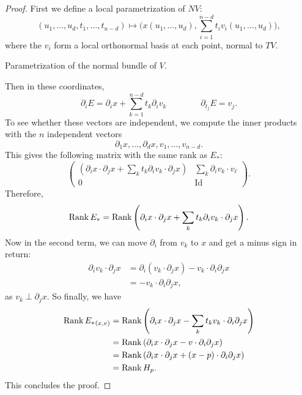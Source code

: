 \begin{proof}
    First we define a local parametrization of $NV$:
    \[
        (u_1, \ldots, u_d, t_1, \ldots, t_{n-d}) \mapsto \Big(x(u_1, \ldots, u_d), \sum_{i=1}^{n-d} t_i v_i(u_1, \ldots, u_{d})\Big)
    ,\] 
    where the $v_i$ form a local orthonormal basis at each point, normal to $TV$.
\begin{marginfigure}
    \centering
    \caption{Parametrization of the normal bundle of $V$.}
    \label{fig:abundance-of-morse-functions-parametrization-of-the-normal-bundle}
\end{marginfigure}
    Then in these coordinates,
    \[
        \partial_i E = \partial_i x  + \sum_{k=1}^{n-d} t_k \partial_i v_k 
        \qquad
        \qquad
        \partial_{t_j} E  = v_j
    .\]
    To see whether these vectors are independent, we compute the inner products with the $n$ independent vectors
    \[
    \partial_1 x , \ldots, \partial_d x , v_1, \ldots, v_{n-d}
    .\] 
    This gives the following matrix with the same rank as $E_*$:
     \[
    \begin{pmatrix}
        (\partial_i x\cdot \partial_j x + \sum_k t_k \partial_iv_{k} \cdot \partial_j x) &  \sum_k \partial_i v_{k} \cdot  v_\ell\\
        0 & \operatorname{Id}
    \end{pmatrix}
    .\] 
    Therefore,
    \[
    \operatorname{Rank} E_* = \operatorname{Rank} \left(\partial_i x\cdot \partial_j x + \sum_k t_k \partial_iv_{k} \cdot \partial_j x\right)  
    .\] 
    Now in the second term, we can move $\partial_i$ from $v_k$ to $x$ and get a minus sign in return:
    \begin{align*}
        \partial_iv_{k} \cdot \partial_j x &= \partial_i (v_k \cdot \partial_j x)  - v_k \cdot  \partial_i \partial_j x\\
                               &= - v_k \cdot  \partial_i \partial_j x
    ,\end{align*} 
    as $v_k \perp \partial_j x$.
    So finally, we have
    \begin{align*}
    \operatorname{Rank} {E_*}_{(x, v)}
        &= \operatorname{Rank} \left(\partial_i x\cdot \partial_j x - \sum_k t_k v_{k} \cdot \partial_i \partial_j x\right)  \\
        &= \operatorname{Rank} \left(\partial_i x\cdot \partial_j x - v \cdot \partial_i \partial_j x\right)  \\
        &= \operatorname{Rank} \left(\partial_i x\cdot \partial_j x + (x-p) \cdot \partial_i \partial_j x\right)  \\
        &= \operatorname{Rank} H_p
    .\end{align*} 
    This concludes the proof.
\end{proof}




